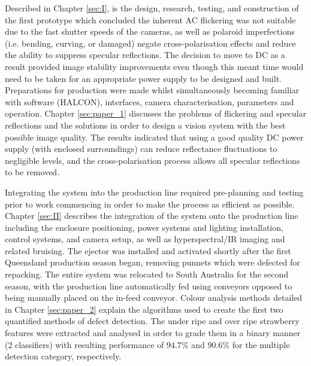 \documentclass[fleqn,twoside,12pt]{report}
\begin{document}
Described in Chapter \ref{sec:I}, is the design, research, testing, and construction of the first prototype which concluded the inherent AC flickering was not suitable due to the fast shutter speeds of the cameras, as well as polaroid imperfections (i.e. bending, curving, or damaged) negate cross-polarisation effects and reduce the ability to suppress specular reflections. The decision to move to DC as a result provided image stability improvements even though this meant time would need to be taken for an appropriate power supply to be designed and built. Preparations for production were made whilst simultaneously becoming familiar with software (HALCON\texttrademark), interfaces, camera characterisation, parameters and operation. Chapter \ref{sec:paper_1} discusses the problems of flickering and specular reflections and the solutions in order to design a vision system with the best possible image quality. The results indicated that using a good quality DC power supply (with enclosed surroundings) can reduce reflectance fluctuations to negligible levels, and the cross-polarisation process allows all specular reflections to be removed. 

Integrating the system into the production line required pre-planning and testing prior to work commencing in order to make the process as efficient as possible. Chapter \ref{sec:II} describes the integration of the system onto the production line including the enclosure positioning, power systems and lighting installation, control systems, and camera setup, as well as hyperspectral/IR imaging and related bruising. The ejector was installed and activated shortly after the first Queensland production season began, removing punnets which were defected for repacking. The entire system was relocated to South Australia for the second season, with the production line automatically fed using conveyors opposed to being manually placed on the in-feed conveyor. Colour analysis methods detailed in Chapter \ref{sec:paper_2} explain the algorithms used to create the first two quantified methods of defect detection. The under ripe and over ripe strawberry features were extracted and analysed in order to grade them in a binary manner (2 classifiers) with resulting performance of $94.7\%$ and $90.6\%$ for the multiple detection category, respectively.
\end{document}
